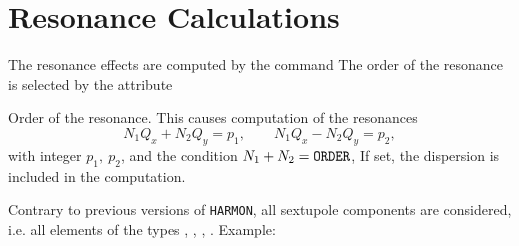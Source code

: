 \section{Resonance Calculations}
\label{S-HRESON}
The resonance effects are computed by the  command
The order of the resonance is selected by the attribute
\begin{mylist}
Order of the resonance.
This causes computation of the resonances
\[
   N_{1}Q_{x}+N_{2}Q_{y}=p_{1},
   \qquad
   N_{1}Q_{x}-N_{2}Q_{y}=p_{2},
\]
with integer \(p_{1},\ p_{2}\), and the condition
\(N_{1}+N_{2} = {\tt ORDER}\),
If set, the dispersion is included in the computation.
\end{mylist}
Contrary to previous versions of {\tt HARMON}, all sextupole components
are considered, i.e. all elements of the types ,
, , .
Example:
 
